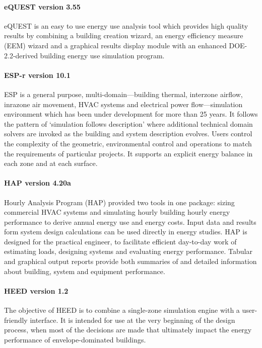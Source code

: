 \paragraph{eQUEST version 3.55} eQUEST is an easy to use energy use analysis tool which provides high quality results by combining a building creation wizard, an energy efficiency measure (EEM) wizard and a graphical results display module with an enhanced DOE-2.2-derived building energy use simulation program. \label{par:eQUEST}

\paragraph{ESP-r version 10.1} ESP is a general purpose, multi-domain---building thermal, interzone airflow, inrazone air movement, HVAC systems and electrical power flow---simulation environment which has been under development for more than 25 years. It follows the pattern of `simulation follows description' where additional technical domain solvers are invoked as the building and system description evolves. Users control the complexity of the geometric, environmental control and operations to match the requirements of particular projects. It supports an explicit energy balance in each zone and at each surface.

\paragraph{HAP version 4.20a} Hourly Analysis Program (HAP) provided two tools in one package: sizing commercial HVAC systems and simulating hourly building hourly energy performance to derive annual energy use and energy costs. Input data and results form system design calculations can be used directly in energy studies. HAP is designed for the practical engineer, to facilitate efficient day-to-day work of estimating loads, designing systems and evaluating energy performance. Tabular and graphical output reports provide both summaries of and detailed information about building, system and equipment performance.

\paragraph{HEED version 1.2} The objective of HEED is to combine a single-zone simulation engine with a user-friendly interface. It is intended for use at the very beginning of the design process, when most of the decisions are made that ultimately impact the energy performance of envelope-dominated buildings.

